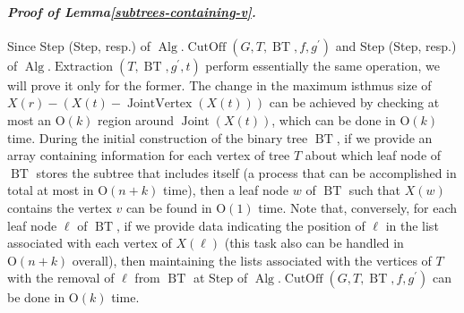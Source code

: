 \documentclass[letter,11pt]{article}
\newcommand{\white}{\qquad{\framebox{\rule{0pt}{4pt}}}}
\newcommand{\owari}{\hfill\white}
\theoremstyle{definition}
\theoremstyle{definition}
\DeclareMathOperator{\BT}{BT}
\DeclareMathOperator{\Alg}{Alg}
\DeclareMathOperator{\Joi}{Joint}
\DeclareMathOperator{\JoiV}{JointVertex}
\DeclareMathOperator{\CutOff}{CutOff}
\DeclareMathOperator{\Extraction}{Extraction}
\newcommand{\1}{\boldmath$~1~$\unboldmath}
\newcommand{\Ord}{\mathrm{O}}
\newcommand{\qedgo}{\vspace{0.35cm}}
\newcommand{\tume}{\hspace*{0.2em}}
\newcommand{\maru}[1]{{\ooalign{\hfill$\small#1$\hfill\crcr\scalebox{1.3}{$\bigcirc$}}}}
\newenvironment{Proofof}[1]{\expandafter
\paragraph{{\it Proof of #1.}}}{\hspace{5mm}\owari\qedgo}
\begin{document}

\begin{Proofof}{Lemma\tume\ref{subtrees-containing-v}}
Since Step\tume\maru{\ref{hige}} (Step\tume\maru{\ref{del-t}}, resp.) of $\Alg.\CutOff(G,T,\BT,f,g^{\prime})$ and Step\tume\maru{\ref{hige2}} (Step\tume\maru{\ref{del-ell}}, resp.) of $\Alg.\Extraction(T, \BT,g^{\prime},t)$ perform essentially the same operation, we will prove it only for the former.
The change in the maximum isthmus size of $X(r)-(X(t)-\JoiV(X(t)))$ can be achieved by checking at most an $\Ord(k)$ region around $\Joi(X(t))$, which can be done in $\Ord(k)$ time. During the initial construction of the binary tree $\BT$, if we provide an array containing information for each vertex of tree $T$ about which leaf node of $\BT$ stores the subtree that includes itself (a process that can be accomplished in total at most in $\Ord(n + k)$ time), then a leaf node $w$ of $\BT$ such that $X(w)$ contains the vertex $v$ can be found in $\Ord(1)$ time. Note that, conversely, for each leaf node $\ell$ of $\BT$, if we provide data indicating the position of $\ell$ in the list associated with each vertex of $X(\ell)$ (this task also can be handled in $\Ord(n+k)$ overall), then maintaining the lists associated with the vertices of $T$ with the removal of $\ell$ from $\BT$ at Step\tume\maru{\ref{del-t}} of $\Alg.\CutOff(G,T,\BT,f,g^{\prime})$ can be done in $\Ord(k)$ time. 
\end{Proofof}


\end{document}
